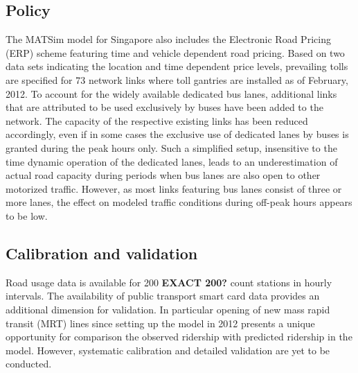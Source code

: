 \subsection{Policy}
The MATSim model for Singapore also includes the Electronic Road Pricing (ERP) scheme featuring time and vehicle dependent road pricing. Based on two data sets indicating the location and time dependent price levels, prevailing tolls are specified for 73 network links where toll gantries are installed as of February, 2012.
To account for the widely available dedicated bus lanes, additional links that are attributed to be used exclusively by buses have been added to the network. The capacity of the respective existing links has been reduced accordingly, even if in some cases the exclusive use of dedicated lanes by buses is granted during the peak hours only. Such a simplified setup, insensitive to the time dynamic operation of the dedicated lanes, leads to an underestimation of actual road capacity during periods when bus lanes are also open to other motorized traffic. However, as most links featuring bus lanes consist of three or more lanes, the effect on modeled traffic conditions during off-peak hours appears to be low.

\subsection{Calibration and validation}
Road usage data is available for 200 \textbf{EXACT 200?} count stations in hourly intervals. The availability of public transport smart card data provides an additional dimension for validation. In particular opening of new mass rapid transit (MRT) lines since setting up the model in 2012 presents a unique opportunity for comparison the observed ridership with predicted ridership in the model. However, systematic calibration and detailed validation are yet to be conducted.

